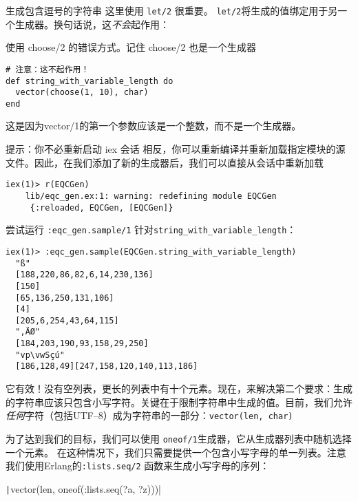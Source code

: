 \begin{example}{生成包含逗号的字符串}
这里使用 \texttt{let/2} 很重要。
\texttt{let/2}将生成的值绑定用于另一个生成器。换句话说，这\emph{不会}起作用：


\begin{code}{使用 choose/2 的错误方式。记住 choose/2 也是一个生成器}
\begin{verbatim}
# 注意：这不起作用！
def string_with_variable_length do
  vector(choose(1, 10), char)
end
\end{verbatim}
\label{lst:the_wrong_way_to_use_choose_2_remember_choose_2_is_also_a_generator}
\end{code}

这是因为vector/1的第一个参数应该是一个整数，而不是一个生成器。

\begin{note}{提示：你不必重新启动 iex 会话}
相反，你可以重新编译并重新加载指定模块的源文件。因此，在我们添加了新的生成器后，我们可以直接从会话中重新加载
\begin{code}{}  \begin{verbatim}
iex(1)> r(EQCGen)
    lib/eqc_gen.ex:1: warning: redefining module EQCGen
     {:reloaded, EQCGen, [EQCGen]}
\end{verbatim}
  \end{code}
\end{note}

尝试运行 \texttt{:eqc\_gen.sample/1} 针对\texttt{string\_with\_variable\_length}：

\begin{code}{}\begin{verbatim}
iex(1)> :eqc_gen.sample(EQCGen.string_with_variable_length)
  "ß"
  [188,220,86,82,6,14,230,136]
  [150]
  [65,136,250,131,106]
  [4]
  [205,6,254,43,64,115]
  ",ÄØ"
  [184,203,190,93,158,29,250]
  "vp\vwSçú"
  [186,128,49][247,158,120,140,113,186]
\end{verbatim}
\end{code}

它有效！没有空列表，更长的列表中有十个元素。现在，来解决第二个要求：生成的字符串应该只包含小写字符。关键在于限制字符串中生成的值。目前，我们允许\emph{任何}字符（包括UTF--8）成为字符串的一部分：\texttt{vector(len, char)}

为了达到我们的目标，我们可以使用 \texttt{oneof/1}生成器，它从生成器列表中随机选择一个元素。
在这种情况下，我们只需要提供一个包含小写字母的单一列表。注意我们使用Erlang的\texttt{:lists.seq/2} 函数来生成小写字母的序列：

\texttt|vector(len, oneof(:lists.seq(?a, ?z)))|


\end{example}
